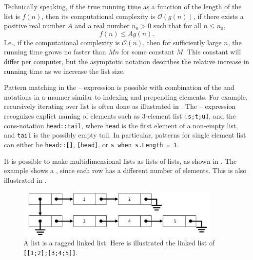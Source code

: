 \documentclass[fsharpNotes.tex]{subfiles}
\begin{document}
Technically speaking, if the true running time as a function of the length of the list is $f(n)$, then its computational complexity is $\mathcal{O}(g(n))$, if there exists a positive real number $A$ and a real number $n_0>0$ such that for all $n\leq n_0$,
\begin{equation}
  f(n) \leq Ag(n).
\end{equation}
I.e., if the computational complexity is $\mathcal{O}(n)$, then for sufficiently large $n$, the running time grows no faster than $Mn$ for some constant $M$. This constant will differ per computer, but the asymptotic notation describes the relative increase in running time as we increase the list size.

Pattern matching in the -- expression is possible with combination of the \lexeme{[]} and \lexeme{::} notations in a manner similar to indexing and prepending elements. For example, recursively iterating over list is often done as illustrated in .
%
%
The -- expression recognizes explict naming of elements such as 3-element list \lstinline{[s;t;u]}, and the cons-notation \lstinline{head::tail}, where \lstinline{head} is the first element of a non-empty list, and \lstinline{tail} is the possibly empty tail. In particular, patterns for single element list can either be \lstinline{head::[]}, \lstinline{[head]}, or \lstinline{s when s.Length = 1}.

It is possible to make multidimensional lists as lists of lists, as shown in . 
%
%
The example shows a , since each row has a different number of elements. This is also illustrated in .
\begin{figure}
  \centering
  \includegraphics[width=0.9\textwidth]{raggedLinkedList}
  \caption{A list is a ragged linked list: Here is illustrated the linked list of \mbox{\lstinline![[1;2];[3;4;5]]!}.}
  \label{fig:raggedLinkedList}
\end{figure}
 
\end{document}
